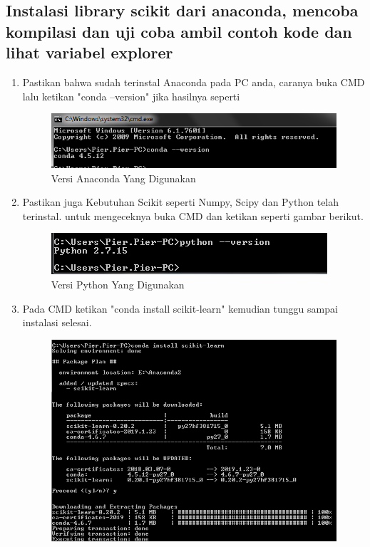 \subsection{Instalasi library scikit dari anaconda, mencoba kompilasi dan uji coba ambil contoh kode dan lihat variabel explorer}
\begin{enumerate}
\item
Pastikan bahwa sudah terinstal Anaconda pada PC anda, caranya buka CMD lalu ketikan "conda --version" jika hasilnya seperti 
\begin{figure}
	\begin{center}
   	 \includegraphics[scale=1]{figures/versiconda.png}
   	 \caption{Versi Anaconda Yang Digunakan}	
	\end{center}
\end{figure}
\item
Pastikan juga Kebutuhan Scikit seperti Numpy, Scipy dan Python telah terinstal. untuk mengeceknya buka CMD dan ketikan seperti gambar berikut.
\begin{figure}
	\begin{center}
   	 \includegraphics[scale=1]{figures/gambar.png}
   	 \caption{Versi Python Yang Digunakan}	
	\end{center}
\end{figure}
\item 
Pada CMD ketikan "conda install scikit-learn" kemudian tunggu sampai instalasi selesai.
\begin{figure}
	\begin{center}
   	 \includegraphics[scale=1]{figures/instalscikit.png}

\end{center}
\end{figure}
\end{enumerate}
